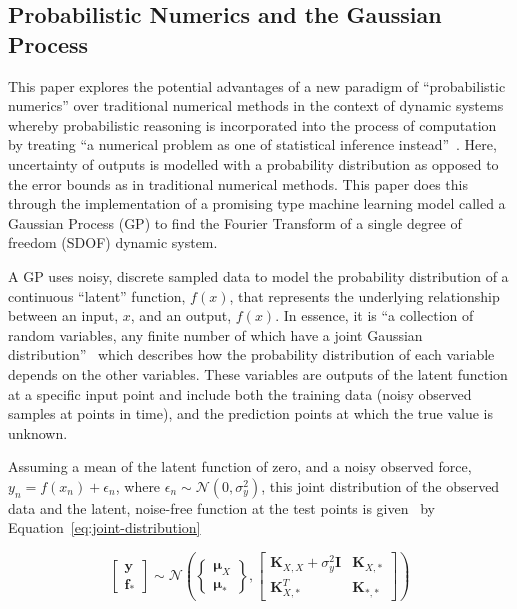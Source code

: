 \documentclass[12pt]{article}
\begin{document}
    \subsection{Probabilistic Numerics and the Gaussian Process}
    This paper explores the potential advantages of a new paradigm of ``probabilistic numerics'' over traditional numerical methods in the context of dynamic systems whereby probabilistic reasoning is incorporated into the process of computation by treating ``a numerical problem as one of statistical inference instead''~\cite{ProbabilisticNumerics2023}.
    Here, uncertainty of outputs is modelled with a probability distribution as opposed to the error bounds as in traditional numerical methods.
    This paper does this through the implementation of a promising type machine learning model called a Gaussian Process (GP) to find the Fourier Transform of a single degree of freedom (SDOF) dynamic system.

    A GP uses noisy, discrete sampled data to model the probability distribution of a continuous ``latent'' function, $f(x)$, that represents the underlying relationship between an input, $x$, and an output, $f(x)$.
    In essence, it is ``a collection of random variables, any finite number of which have a joint Gaussian distribution''~\cite{rasmussen2006gaussian} which describes how the probability distribution of each variable depends on the other variables.
    These variables are outputs of the latent function at a specific input point and include both the training data (noisy observed samples at points in time), and the prediction points at which the true value is unknown.

    Assuming a mean of the latent function of zero, and a noisy observed force, $y_n = f(x_n)+\epsilon_n$, where $\epsilon_n \sim \mathcal{N}(0, \sigma^2_y)$, this joint distribution of the observed data and the latent, noise-free function at the test points is given~\cite{murphy2023probabilistic} by Equation~\ref{eq:joint-distribution}

    \begin{equation}
        \left[
            \begin{array}{c}
                \mathbf{y} \\
                \mathbf{f}_*
            \end{array}
            \right]
        \sim \mathcal{N} \left(
        \left\{
        \begin{array}{c}
            \boldsymbol{\mu}_X \\
            \boldsymbol{\mu}_*
        \end{array}
        \right\},
        \left[
            \begin{array}{cc}
                \mathbf{K}_{X,X} + \sigma^2_y \mathbf{I} & \mathbf{K}_{X,*} \\
                \mathbf{K}_{X,*}^T & \mathbf{K}_{*,*}
            \end{array}
            \right]
        \right)\label{eq:joint-distribution}
    \end{equation}
\end{document}
